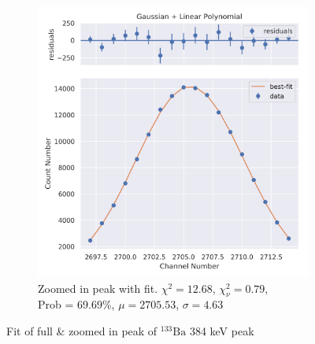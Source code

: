 \documentclass[11pt,a4paper]{article}
\newcommand{\element}[2]{$^{#2}\textrm{#1}$}
\begin{document}
\begin{figure}[H]
\begin{subfigure}{.5\linewidth}
    \includegraphics[width=\linewidth]{./Images/Barium133/Linear/Linear_7_Zoom.png}
    \caption{Zoomed in peak with fit. $\chi^2 = 12.68$, $\chi^2_\nu = 0.79$, \\ Prob = 69.69\%, $\mu = 2705.53$, $\sigma = 4.63$}
  \end{subfigure}
  \caption{Fit of full \& zoomed in peak of \element{Ba}{133} 384 keV peak}
\end{figure}
\clearpage
\end{document}
